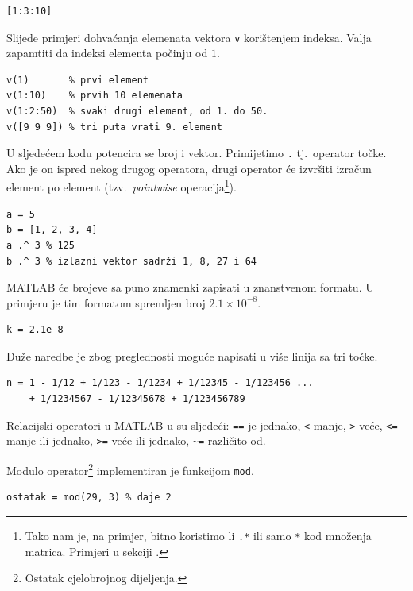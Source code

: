 \documentclass[a4paper, 10pt]{article}
\newcommand{\spec}[1]{\texttt{#1}} %
\newcommand{\eng}[1]{\emph{#1}} %
\begin{document}
\begin{lstlisting}
[1:3:10]
\end{lstlisting}

Slijede primjeri dohvaćanja elemenata vektora \spec{v} korištenjem indeksa.
Valja zapamtiti da indeksi elementa počinju od $1$.

\begin{lstlisting}
v(1)       % prvi element
v(1:10)    % prvih 10 elemenata
v(1:2:50)  % svaki drugi element, od 1. do 50.
v([9 9 9]) % tri puta vrati 9. element
\end{lstlisting}

U sljedećem kodu potencira se broj i vektor.
Primijetimo \spec{.} tj.\ operator točke.
Ako je on ispred nekog drugog operatora, drugi operator će izvršiti izračun element po element (tzv.\ \eng{pointwise} operacija\footnote{Tako nam je, na primjer, bitno koristimo li \spec{.*} ili samo \spec{*} kod množenja matrica.
Primjeri u sekciji .}).

\begin{lstlisting}
a = 5
b = [1, 2, 3, 4]
a .^ 3 % 125
b .^ 3 % izlazni vektor sadrži 1, 8, 27 i 64
\end{lstlisting}

MATLAB će brojeve sa puno znamenki zapisati u znanstvenom formatu.
U primjeru je tim formatom spremljen broj $2.1 \times 10^{-8}$.

\begin{lstlisting}
k = 2.1e-8
\end{lstlisting}

Duže naredbe je zbog preglednosti moguće napisati u više linija sa tri točke.

\begin{lstlisting}
n = 1 - 1/12 + 1/123 - 1/1234 + 1/12345 - 1/123456 ...
    + 1/1234567 - 1/12345678 + 1/123456789
\end{lstlisting}

Relacijski operatori u MATLAB-u su sljedeći: \spec{==} je jednako, \spec{<} manje, \spec{>} veće, \spec{<=} manje ili jednako, \spec{>=} veće ili jednako, \spec{\textasciitilde=} različito od.

\pagebreak

Modulo operator\footnote{Ostatak cjelobrojnog dijeljenja.} implementiran je funkcijom \spec{mod}.

\begin{lstlisting}
ostatak = mod(29, 3) % daje 2
\end{lstlisting}
\end{document}
